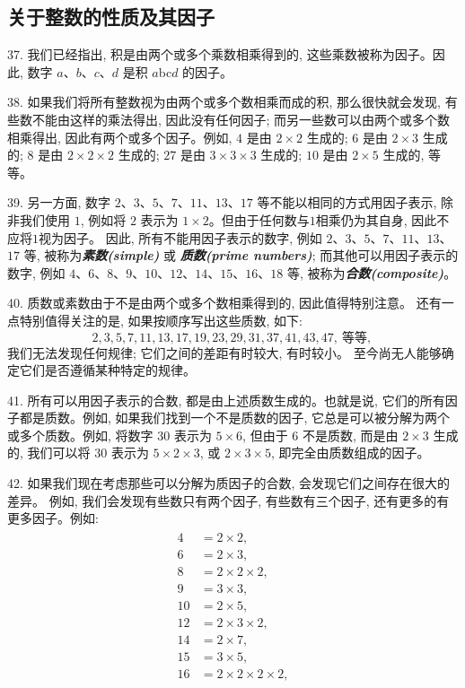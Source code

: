 \subsection{关于整数的性质及其因子}
\par
37. 我们已经指出, 积是由两个或多个乘数相乘得到的, 
这些乘数被称为因子。因此, 数字 $a$、$b$、$c$、$d$ 是积 $a$bc$d$ 的因子。
\par
38. 如果我们将所有整数视为由两个或多个数相乘而成的积, 那么很快就会发现, 
有些数不能由这样的乘法得出, 因此没有任何因子; 而另一些数可以由两个或多个数相乘得出, 
因此有两个或多个因子。例如, $4$ 是由 $2 \times 2$ 生成的; $6$ 是由 $2 \times 3$ 生成的; 
$8$ 是由 $2 \times 2 \times 2$ 生成的; $27$ 是由 $3 \times 3 \times 3$ 生成的; 
$10$ 是由 $2 \times 5$ 生成的, 等等。
\par
39. 另一方面, 数字 $2$、$3$、$5$、$7$、$11$、$13$、$17$ 等不能以相同的方式用因子表示, 
除非我们使用 $1$, 例如将 $2$ 表示为 $1 \times 2$。但由于任何数与$1$相乘仍为其自身, 因此不应将$1$视为因子。  
因此, 所有不能用因子表示的数字, 
例如 $2$、$3$、$5$、$7$、$11$、$13$、$17$ 等, 
被称为\textbf{\textit{素数(simple)}} 或 \textbf{\textit{质数(prime numbers)}}; 
而其他可以用因子表示的数字, 例如 $4$、$6$、$8$、$9$、$10$、$12$、$14$、$15$、$16$、$18$ 等, 
被称为\textbf{\textit{合数(composite)}}。
\par
40. 质数或素数由于不是由两个或多个数相乘得到的, 因此值得特别注意。
还有一点特别值得关注的是, 如果按顺序写出这些质数, 如下: 
\[
2, 3, 5, 7, 11, 13, 17, 19, 23, 29, 31, 37, 41, 43, 47, \ \text{等等, }
\]
我们无法发现任何规律; 它们之间的差距有时较大, 有时较小。
至今尚无人能够确定它们是否遵循某种特定的规律。
\par
41. 所有可以用因子表示的合数, 都是由上述质数生成的。也就是说, 
它们的所有因子都是质数。例如, 如果我们找到一个不是质数的因子, 
它总是可以被分解为两个或多个质数。例如, 将数字 $30$ 表示为 $5 \times 6$, 
但由于 $6$ 不是质数, 而是由 $2 \times 3$ 生成的, 我们可以将 $30$ 表示为 $5 \times 2 \times 3$, 
或 $2 \times 3 \times 5$, 即完全由质数组成的因子。
\par
42. 如果我们现在考虑那些可以分解为质因子的合数, 会发现它们之间存在很大的差异。
例如, 我们会发现有些数只有两个因子, 有些数有三个因子, 还有更多的有更多因子。例如:   
\begin{gather*}
	\begin{aligned}
		4 &= 2 \times 2, \\
		6 &= 2 \times 3, \\
		8 &= 2 \times 2 \times 2, \\
		9 &= 3 \times 3, \\
		10 &= 2 \times 5, \\
		12 &= 2 \times 3 \times 2, \\
		14 &= 2 \times 7, \\
		15 &= 3 \times 5, \\
		16 &= 2 \times 2 \times 2 \times 2, \\
	\end{aligned}
\end{gather*}

